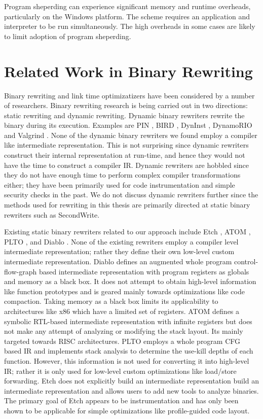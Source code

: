 Program sheperding can experience significant memory and runtime overheads, particularly on the
Windows platform. The scheme requires an application and interpreter to be run simultaneously. The
high overheads in some cases are likely to limit adoption of program sheperding.

\section{Related Work in Binary Rewriting}

Binary rewriting and link time optimizatizers have been considered by a number of researchers.
Binary rewriting research is being carried out in two directions: static rewriting and dynamic
rewriting. Dynamic binary rewriters rewrite the binary during its execution. Examples are PIN
\cite{pin}, BIRD \cite{bird}, DynInst \cite{dyninst}, DynamoRIO \cite{drio} and Valgrind \cite{valg}. None of the dynamic
binary rewriters we found employ a compiler like intermediate representation. This is not surprising
since dynamic rewriters construct their internal representation at run-time, and hence they would
not have the time to construct a compiler IR. Dynamic rewriters are hobbled since they do not have
enough time to perform complex compiler transformations either; they have been primarily used for
code instrumentation and simple security checks in the past. We do not discuss dynamic rewriters
further since the methods used for rewriting in this thesis are primarily directed at static binary
rewriters such as SecondWrite.

Existing static binary rewriters related to our approach include Etch \cite{etch}, ATOM \cite{atom}, PLTO
\cite{plto}, and Diablo \cite{Diablo1}. None of the existing rewriters employ a compiler level intermediate
representation; rather they define their own low-level custom intermediate representation. Diablo
defines an augmented whole program control-flow-graph based intermediate representation with program
registers as globals and memory as a black box. It does not attempt to obtain high-level information
like function prototypes and is geared mainly towards optimizations like code compaction. Taking
memory as a black box limits its applicability to architectures like x86 which have a limited set of
registers. ATOM defines a symbolic RTL-based intermediate representation with infinite registers but
does not make any attempt of analyzing or modifying the stack layout. Its mainly targeted towards
RISC architectures. PLTO employs a whole program CFG based IR and implements stack analysis to
determine the use-kill depths of each function. However, this information is not used for
converting it into high-level IR; rather it is only used for low-level custom optimizations like
load/store forwarding. Etch does not explicitly build an intermediate representation build an
intermediate representation and allows users to add new tools to analyze binaries. The primary goal
of Etch appears to be instrumentation and has only been shown to be applicable for simple
optimizations like profile-guided code layout.

